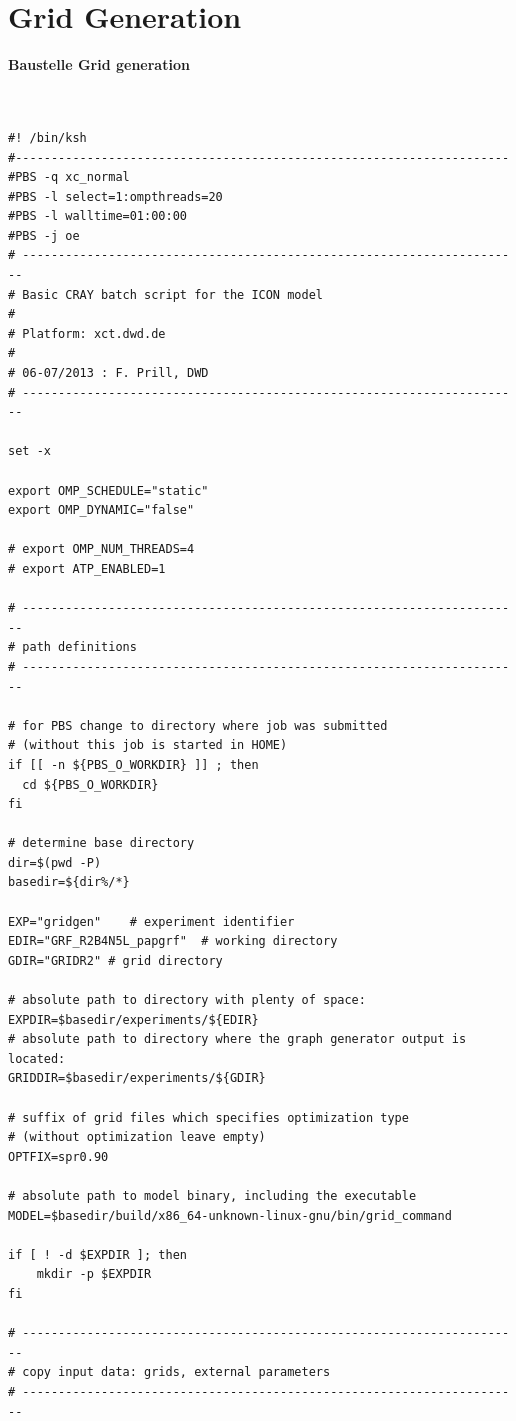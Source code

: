 \section{Grid Generation}
\label{chap:UG_grid_generation}

\textbf{Baustelle Grid generation}

\begin{Verbatim}[frame=single]


#! /bin/ksh
#---------------------------------------------------------------------
#PBS -q xc_normal
#PBS -l select=1:ompthreads=20
#PBS -l walltime=01:00:00
#PBS -j oe
# ----------------------------------------------------------------------
# Basic CRAY batch script for the ICON model
#
# Platform: xct.dwd.de
#
# 06-07/2013 : F. Prill, DWD
# ----------------------------------------------------------------------

set -x

export OMP_SCHEDULE="static"
export OMP_DYNAMIC="false"

# export OMP_NUM_THREADS=4
# export ATP_ENABLED=1

# ----------------------------------------------------------------------
# path definitions
# ----------------------------------------------------------------------

# for PBS change to directory where job was submitted
# (without this job is started in HOME)
if [[ -n ${PBS_O_WORKDIR} ]] ; then
  cd ${PBS_O_WORKDIR}
fi

# determine base directory
dir=$(pwd -P)
basedir=${dir%/*}

EXP="gridgen"    # experiment identifier
EDIR="GRF_R2B4N5L_papgrf"  # working directory
GDIR="GRIDR2" # grid directory

# absolute path to directory with plenty of space:
EXPDIR=$basedir/experiments/${EDIR}
# absolute path to directory where the graph generator output is located:
GRIDDIR=$basedir/experiments/${GDIR}

# suffix of grid files which specifies optimization type
# (without optimization leave empty)
OPTFIX=spr0.90

# absolute path to model binary, including the executable
MODEL=$basedir/build/x86_64-unknown-linux-gnu/bin/grid_command

if [ ! -d $EXPDIR ]; then
    mkdir -p $EXPDIR
fi

# ----------------------------------------------------------------------
# copy input data: grids, external parameters
# ----------------------------------------------------------------------


\end{Verbatim}
